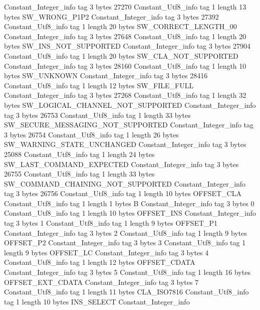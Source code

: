 {{{		}
		Constant_Integer_info {
			tag	3
			bytes	27270
		}
		Constant_Utf8_info {
			tag	1
			length	13
			bytes	SW_WRONG_P1P2
		}
		Constant_Integer_info {
			tag	3
			bytes	27392
		}
		Constant_Utf8_info {
			tag	1
			length	20
			bytes	SW_CORRECT_LENGTH_00
		}
		Constant_Integer_info {
			tag	3
			bytes	27648
		}
		Constant_Utf8_info {
			tag	1
			length	20
			bytes	SW_INS_NOT_SUPPORTED
		}
		Constant_Integer_info {
			tag	3
			bytes	27904
		}
		Constant_Utf8_info {
			tag	1
			length	20
			bytes	SW_CLA_NOT_SUPPORTED
		}
		Constant_Integer_info {
			tag	3
			bytes	28160
		}
		Constant_Utf8_info {
			tag	1
			length	10
			bytes	SW_UNKNOWN
		}
		Constant_Integer_info {
			tag	3
			bytes	28416
		}
		Constant_Utf8_info {
			tag	1
			length	12
			bytes	SW_FILE_FULL
		}
		Constant_Integer_info {
			tag	3
			bytes	27268
		}
		Constant_Utf8_info {
			tag	1
			length	32
			bytes	SW_LOGICAL_CHANNEL_NOT_SUPPORTED
		}
		Constant_Integer_info {
			tag	3
			bytes	26753
		}
		Constant_Utf8_info {
			tag	1
			length	33
			bytes	SW_SECURE_MESSAGING_NOT_SUPPORTED
		}
		Constant_Integer_info {
			tag	3
			bytes	26754
		}
		Constant_Utf8_info {
			tag	1
			length	26
			bytes	SW_WARNING_STATE_UNCHANGED
		}
		Constant_Integer_info {
			tag	3
			bytes	25088
		}
		Constant_Utf8_info {
			tag	1
			length	24
			bytes	SW_LAST_COMMAND_EXPECTED
		}
		Constant_Integer_info {
			tag	3
			bytes	26755
		}
		Constant_Utf8_info {
			tag	1
			length	33
			bytes	SW_COMMAND_CHAINING_NOT_SUPPORTED
		}
		Constant_Integer_info {
			tag	3
			bytes	26756
		}
		Constant_Utf8_info {
			tag	1
			length	10
			bytes	OFFSET_CLA
		}
		Constant_Utf8_info {
			tag	1
			length	1
			bytes	B
		}
		Constant_Integer_info {
			tag	3
			bytes	0
		}
		Constant_Utf8_info {
			tag	1
			length	10
			bytes	OFFSET_INS
		}
		Constant_Integer_info {
			tag	3
			bytes	1
		}
		Constant_Utf8_info {
			tag	1
			length	9
			bytes	OFFSET_P1
		}
		Constant_Integer_info {
			tag	3
			bytes	2
		}
		Constant_Utf8_info {
			tag	1
			length	9
			bytes	OFFSET_P2
		}
		Constant_Integer_info {
			tag	3
			bytes	3
		}
		Constant_Utf8_info {
			tag	1
			length	9
			bytes	OFFSET_LC
		}
		Constant_Integer_info {
			tag	3
			bytes	4
		}
		Constant_Utf8_info {
			tag	1
			length	12
			bytes	OFFSET_CDATA
		}
		Constant_Integer_info {
			tag	3
			bytes	5
		}
		Constant_Utf8_info {
			tag	1
			length	16
			bytes	OFFSET_EXT_CDATA
		}
		Constant_Integer_info {
			tag	3
			bytes	7
		}
		Constant_Utf8_info {
			tag	1
			length	11
			bytes	CLA_ISO7816
		}
		Constant_Utf8_info {
			tag	1
			length	10
			bytes	INS_SELECT
		}
		Constant_Integer_info {
}}}
